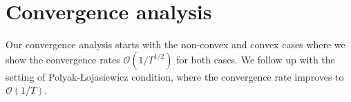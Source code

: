 \documentclass[11pt,a4paper]{article}
\numberwithin{equation}{section}%
\renewcommand{\(}{\left (}
\renewcommand{\)}{\right )}
\begin{document}



\section{Convergence analysis}\label{sec:ana}
Our convergence analysis starts with the non-convex and convex cases where we show the convergence rates $\mathcal{O}(1/T^{1/2})$ for both cases. We follow up with the setting of Polyak-Łojasiewicz condition, where the  convergence rate improves to $\mathcal{O}(1/T)$. 
\end{document}
